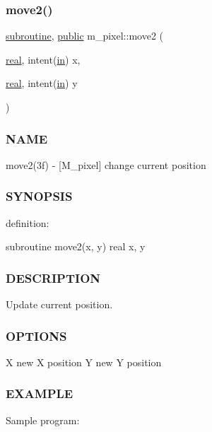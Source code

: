 \subsubsection{\texorpdfstring{move2()}{move2()}}
{\footnotesize\ttfamily \hyperlink{M__stopwatch_83_8txt_acfbcff50169d691ff02d4a123ed70482}{subroutine}, \hyperlink{M__stopwatch_83_8txt_a2f74811300c361e53b430611a7d1769f}{public} m\+\_\+pixel\+::move2 (\begin{DoxyParamCaption}\item[{\hyperlink{read__watch_83_8txt_abdb62bde002f38ef75f810d3a905a823}{real}, intent(\hyperlink{M__journal_83_8txt_afce72651d1eed785a2132bee863b2f38}{in})}]{x,  }\item[{\hyperlink{read__watch_83_8txt_abdb62bde002f38ef75f810d3a905a823}{real}, intent(\hyperlink{M__journal_83_8txt_afce72651d1eed785a2132bee863b2f38}{in})}]{y }\end{DoxyParamCaption})}



\subsubsection*{N\+A\+ME}

move2(3f) -\/ \mbox{[}M\+\_\+pixel\mbox{]} change current position 

\subsubsection*{S\+Y\+N\+O\+P\+S\+IS}

definition\+:

subroutine move2(x, y) real x, y

\subsubsection*{D\+E\+S\+C\+R\+I\+P\+T\+I\+ON}

Update current position.

\subsubsection*{O\+P\+T\+I\+O\+NS}

X new X position Y new Y position

\subsubsection*{E\+X\+A\+M\+P\+LE}

Sample program\+:

